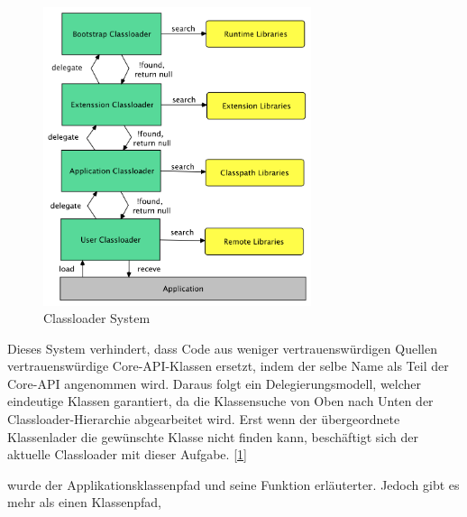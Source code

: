 \begin{figure}[h]
  \centering
  \includegraphics[width=0.7\textwidth]{material/images/Classloader.png}
  \caption{Classloader System}
  \label{fig:Classloader}
\end{figure}
Dieses System verhindert, dass Code aus weniger vertrauenswürdigen Quellen vertrauenswürdige Core-API-Klassen ersetzt, indem der selbe Name als Teil der Core-API angenommen wird. Daraus folgt ein Delegierungsmodell, welcher eindeutige Klassen garantiert, da die Klassensuche von Oben nach Unten der Classloader-Hierarchie abgearbeitet wird. Erst wenn der übergeordnete Klassenlader die gewünschte Klasse nicht finden kann, beschäftigt sich der aktuelle Classloader mit dieser Aufgabe. [\ref{fig:Classloader}]




wurde der Applikationsklassenpfad und seine Funktion erläuterter. Jedoch gibt es mehr als einen Klassenpfad, 


